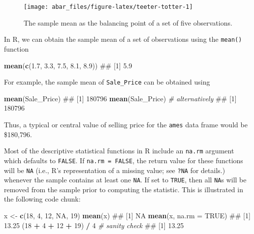 \documentclass[]{book}
\newenvironment{Shaded}{\begin{snugshade}}{\end{snugshade}}
\newcommand{\CommentTok}[1]{\textcolor[rgb]{0.56,0.35,0.01}{\textit{#1}}}
\newcommand{\DataTypeTok}[1]{\textcolor[rgb]{0.13,0.29,0.53}{#1}}
\newcommand{\DecValTok}[1]{\textcolor[rgb]{0.00,0.00,0.81}{#1}}
\newcommand{\FloatTok}[1]{\textcolor[rgb]{0.00,0.00,0.81}{#1}}
\newcommand{\KeywordTok}[1]{\textcolor[rgb]{0.13,0.29,0.53}{\textbf{#1}}}
\newcommand{\NormalTok}[1]{#1}
\newcommand{\OperatorTok}[1]{\textcolor[rgb]{0.81,0.36,0.00}{\textbf{#1}}}
\newcommand{\OtherTok}[1]{\textcolor[rgb]{0.56,0.35,0.01}{#1}}
\newcommand{\StringTok}[1]{\textcolor[rgb]{0.31,0.60,0.02}{#1}}
\theoremstyle{definition}
\theoremstyle{definition}
\theoremstyle{definition}
\theoremstyle{remark}
\let\BeginKnitrBlock\begin \let\EndKnitrBlock\end
\begin{document}
\begin{figure}

{\centering \texttt{[image: abar\_files/figure-latex/teeter-totter-1]} 

}

\caption{The sample mean as the balancing point of a set of five observations.}\label{fig:teeter-totter}
\end{figure}

In R, we can obtain the sample mean of a set of observations using the
\texttt{mean()} function

\begin{Shaded}
\begin{Highlighting}[]
\KeywordTok{mean}\NormalTok{(}\KeywordTok{c}\NormalTok{(}\FloatTok{1.7}\NormalTok{, }\FloatTok{3.3}\NormalTok{, }\FloatTok{7.5}\NormalTok{, }\FloatTok{8.1}\NormalTok{, }\FloatTok{8.9}\NormalTok{))}
\NormalTok{## [1] 5.9}
\end{Highlighting}
\end{Shaded}

For example, the sample mean of \texttt{Sale\_Price} can be obtained
using

\begin{Shaded}
\begin{Highlighting}[]
\KeywordTok{mean}\NormalTok{(Sale_Price)}
\NormalTok{## [1] 180796}
\KeywordTok{mean}\NormalTok{(Sale_Price)  }\CommentTok{# alternatively}
\NormalTok{## [1] 180796}
\end{Highlighting}
\end{Shaded}

Thus, a typical or central value of selling price for the \texttt{ames}
data frame would be \$180,796.

\BeginKnitrBlock{note}
Most of the descriptive statistical functions in R include an
\texttt{na.rm} argument which defaults to \texttt{FALSE}. If
\texttt{na.rm\ =\ FALSE}, the return value for these functions will be
\texttt{NA} (i.e., R's representation of a missing value; see
\texttt{?NA} for details.) whenever the sample contains at least one
\texttt{NA}. If set to \texttt{TRUE}, then all \texttt{NA}s will be
removed from the sample prior to computing the statistic. This is
illustrated in the following code chunk:
\EndKnitrBlock{note}

\begin{Shaded}
\begin{Highlighting}[]
\NormalTok{x <-}\StringTok{ }\KeywordTok{c}\NormalTok{(}\DecValTok{18}\NormalTok{, }\DecValTok{4}\NormalTok{, }\DecValTok{12}\NormalTok{, }\OtherTok{NA}\NormalTok{, }\DecValTok{19}\NormalTok{)}
\KeywordTok{mean}\NormalTok{(x)}
\NormalTok{## [1] NA}
\KeywordTok{mean}\NormalTok{(x, }\DataTypeTok{na.rm =} \OtherTok{TRUE}\NormalTok{)}
\NormalTok{## [1] 13.25}
\NormalTok{(}\DecValTok{18} \OperatorTok{+}\StringTok{ }\DecValTok{4} \OperatorTok{+}\StringTok{ }\DecValTok{12} \OperatorTok{+}\StringTok{ }\DecValTok{19}\NormalTok{) }\OperatorTok{/}\StringTok{ }\DecValTok{4}  \CommentTok{# sanity check}
\NormalTok{## [1] 13.25}
\end{Highlighting}
\end{Shaded}
\end{document}

